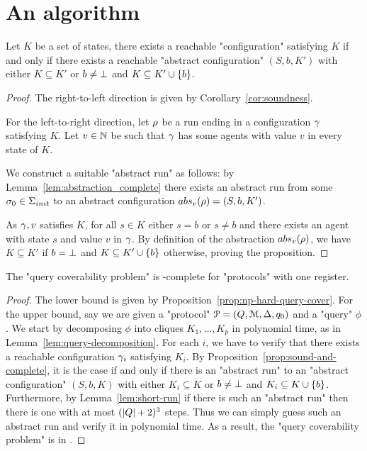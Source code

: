 \section{An \np algorithm}

\begin{proposition}
	\label{prop:sound-and-complete}
	Let $K$ be a set of states, there exists a reachable "configuration" satisfying $K$ if and only if there exists a reachable "abstract configuration" $(S,b,K')$ with either $K \subseteq K'$ or $b \neq \bot$ and $K \subseteq K' \cup \{b\}$.  
\end{proposition}

\begin{proof}
	The right-to-left direction is given by Corollary~\ref{cor:soundness}.
	
	For the left-to-right direction, let $\rho$ be a run ending in a configuration $\gamma$ satisfying $K$. Let $v \in \mathbb{N}$ be such that $\gamma$ has some agents with value $v$ in every state of $K$.
	
	We construct a suitable "abstract run" as follows: by Lemma~\ref{lem:abstraction_complete} there exists an abstract run from some $\sigma_0 \in \aconfiginitset$ to an abstract configuration $\absproj{v}{\run} = (S, b, K')$.
	
	As $\gamma, v$ satisfies $K$, for all $s \in K$ either $s = b$ or $s \neq b$ and there exists an agent with state $s$ and value $v$ in $\gamma$. 	
	By definition of the abstraction $\absproj{v}{\run}$, we have $K \subseteq K'$ if $b=\bot$ and $K \subseteq K' \cup \{b\}$ otherwise, proving the proposition.
\end{proof}

\begin{theorem}
	\label{thm:np-complete-query-cover}
	The "query coverability problem" is \np-complete for "protocols" with one register.
\end{theorem}

\begin{proof}
	The lower bound is given by Proposition~\ref{prop:np-hard-query-cover}.
	For the upper bound, say we are given a "protocol" $\mathcal{P} = (Q, \mathcal{M}, \Delta, q_0)$ and a "query" $\phi$.
	We start by decomposing $\phi$ into cliques $K_1, \ldots, K_p$ in polynomial time, as in Lemma~\ref{lem:query-decomposition}.
	For each $i$, we have to verify that there exists a reachable configuration $\gamma_i$ satisfying $K_i$. By Proposition~\ref{prop:sound-and-complete}, it is the case if and only if there is an "abstract run" to an "abstract configuration" $(S,b, K)$ with either $K_i \subseteq K$ or $b\neq \bot$ and $K_i \subseteq K\cup\{b\}$.
	Furthermore, by Lemma~\ref{lem:short-run} if there is such an "abstract run" then there is one with at most $(|Q|+2)^3$ steps. 
	Thus we can simply guess such an abstract run and verify it in polynomial time.
	As a result, the "query coverability problem" is in \np. 
\end{proof}